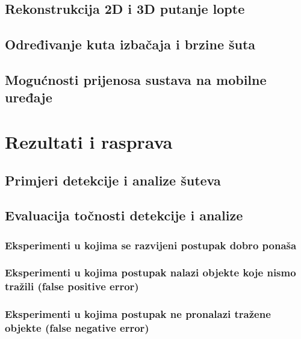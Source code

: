 \documentclass[zavrsnirad]{fer}
\begin{document}
\section{Rekonstrukcija 2D i 3D putanje lopte}
\label{pog:rekonstrukcija_2d_i_3d_putanje_lopte}

\section{Određivanje kuta izbačaja i brzine šuta}
\label{pog:odredivanje_kuta_izbacaja_i_brzine_suta}


\section{Mogućnosti prijenosa sustava na mobilne uređaje}
\label{pog:mogucnosti_prijenosa_sustava_na_mobilne_uredaje}


\chapter{Rezultati i rasprava}
\label{pog:rezultati_i_rasprava}

\section{Primjeri detekcije i analize šuteva}
\label{pog:primjeri_detekcije_i_analize_suteva}
\section{Evaluacija točnosti detekcije i analize}
\label{pog:evaluacija_tocnosti_detekcije_i_analize}
\subsection{Eksperimenti u kojima se razvijeni postupak dobro ponaša}
\label{pog:eksperimenti_u_kojima_se_razvijeni_postupak_dobro_ponasa}
\subsection{Eksperimenti u kojima postupak nalazi objekte koje nismo tražili (false positive error)}
\label{pog:eksperimenti_u_kojima_postupak_nalazi_objekte_koje_nismo_trazili}

\subsection{Eksperimenti u kojima postupak ne pronalazi tražene objekte (false negative error)}
\label{pog:eksperimenti_u_kojima_postupak_ne_pronalazi_trazene_objekte}
\end{document}
